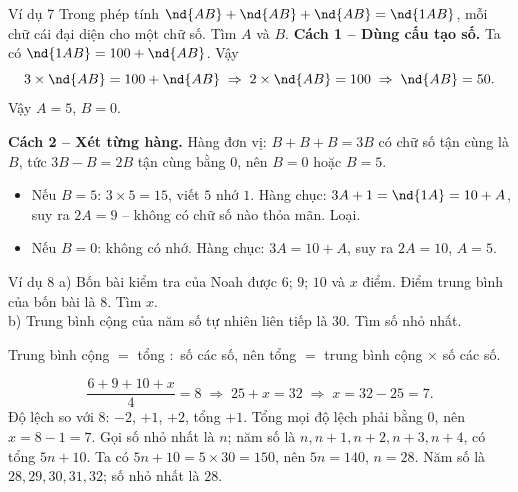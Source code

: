 \begin{exbox}{Ví dụ 7}
Trong phép tính $\nd{AB} + \nd{AB} + \nd{AB} = \nd{1AB}$, mỗi chữ cái đại diện cho một chữ số. Tìm $A$ và $B$.
\guide
\textbf{Cách 1 -- Dùng cấu tạo số.} Ta có $\nd{1AB} = 100 + \nd{AB}$. Vậy
\[ 3\times\nd{AB} = 100 + \nd{AB} \;\Rightarrow\; 2\times\nd{AB} = 100 \;\Rightarrow\; \nd{AB} = 50. \]
Vậy $A = 5$, $B = 0$.

\textbf{Cách 2 -- Xét từng hàng.} Hàng đơn vị: $B + B + B = 3B$ có chữ số tận cùng là $B$, tức $3B - B = 2B$ tận cùng
bằng $0$, nên $B = 0$ hoặc $B = 5$.
\begin{itemize}[leftmargin=1.4em,itemsep=1pt,topsep=1pt]
  \item Nếu $B = 5$: $3\times 5 = 15$, viết $5$ nhớ $1$. Hàng chục: $3A + 1 = \nd{1A} = 10 + A$, suy ra $2A = 9$ -- không có
  chữ số nào thỏa mãn. Loại.
  \item Nếu $B = 0$: không có nhớ. Hàng chục: $3A = 10 + A$, suy ra $2A = 10$, $A = 5$.
\end{itemize}
\end{exbox}

\begin{exbox}{Ví dụ 8}
a) Bốn bài kiểm tra của Noah được $6$; $9$; $10$ và $x$ điểm. Điểm trung bình của bốn bài là $8$. Tìm $x$.\\
b) Trung bình cộng của năm số tự nhiên liên tiếp là $30$. Tìm số nhỏ nhất.
\guide
{}
\begin{recallbox}Trung bình cộng $=$ tổng $:$ số các số, nên tổng $=$ trung bình cộng $\times$ số các số.\end{recallbox}
\[ \frac{6 + 9 + 10 + x}{4} = 8 \;\Rightarrow\; 25 + x = 32 \;\Rightarrow\; x = 32 - 25 = 7. \]
Độ lệch so với $8$: $-2$, $+1$, $+2$, tổng $+1$. Tổng mọi độ lệch phải bằng $0$, nên $x = 8 - 1 = 7$.
Gọi số nhỏ nhất là $n$; năm số là $n, n+1, n+2, n+3, n+4$, có tổng $5n + 10$. Ta có
$5n + 10 = 5\times 30 = 150$, nên $5n = 140$, $n = 28$.
Năm số là $28, 29, 30, 31, 32$; số nhỏ nhất là $28$.
\end{exbox}

\clearpage
{}

